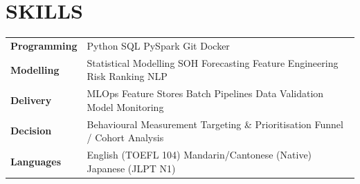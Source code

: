 \documentclass[a4paper,10pt]{article}
\begin{document}
\section{SKILLS}
\begin{tabular}{@{}p{2.5cm}p{14.5cm}@{}}
\textbf{Programming} & Python \textperiodcentered{} SQL \textperiodcentered{} PySpark \textperiodcentered{} Git \textperiodcentered{} Docker \\[0.5pt]
\textbf{Modelling} & Statistical Modelling \textperiodcentered{} SOH Forecasting \textperiodcentered{} Feature Engineering \textperiodcentered{} Risk Ranking \textperiodcentered{} NLP \\[0.5pt]
\textbf{Delivery} & MLOps \textperiodcentered{} Feature Stores \textperiodcentered{} Batch Pipelines \textperiodcentered{} Data Validation \textperiodcentered{} Model Monitoring \\[0.5pt]
\textbf{Decision} & Behavioural Measurement \textperiodcentered{} Targeting \& Prioritisation \textperiodcentered{} Funnel / Cohort Analysis \\[0.5pt]
\textbf{Languages} & English (TOEFL 104) \textperiodcentered{} Mandarin/Cantonese (Native) \textperiodcentered{} Japanese (JLPT N1) \\
\end{tabular}
\end{document}

